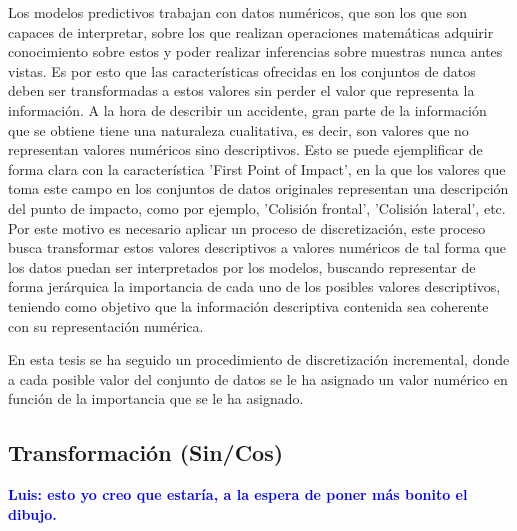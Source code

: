 \documentclass{uathesis-es}
\begin{document}
Los modelos predictivos trabajan con datos numéricos, que son los que son capaces de interpretar, sobre los que realizan operaciones matemáticas adquirir conocimiento sobre estos y poder realizar inferencias sobre muestras nunca antes vistas. Es por esto que las características ofrecidas en los conjuntos de datos deben ser transformadas a estos valores sin perder el valor que representa la información. A la hora de describir un accidente, gran parte de la información que se obtiene tiene una naturaleza cualitativa, es decir, son valores que no representan valores numéricos sino descriptivos. Esto se puede ejemplificar de forma clara con la característica 'First Point of Impact', en la que los valores que toma este campo en los conjuntos de datos originales representan una descripción del punto de impacto, como por ejemplo,  'Colisión frontal', 'Colisión lateral', etc. Por este motivo es necesario aplicar un proceso de discretización, este proceso busca transformar estos valores descriptivos a valores numéricos de tal forma que los datos puedan ser interpretados por los modelos, buscando representar de forma jerárquica la importancia de cada uno de los posibles valores descriptivos, teniendo como objetivo que la información descriptiva contenida sea coherente con su representación numérica.


En esta tesis se ha seguido un procedimiento de discretización incremental, donde a cada posible valor del conjunto de datos se le ha asignado un valor numérico en función de la importancia que se le ha asignado.

\subsection{Transformación (Sin/Cos)}

\textcolor{blue}{\textbf{Luis: esto yo creo que estaría, a la espera de poner más bonito el dibujo.}}\\
\end{document}
